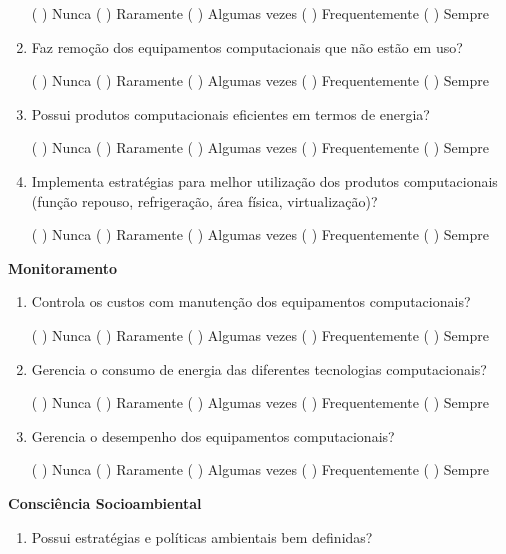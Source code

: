 \begin{apendicesenv}
\begin{enumerate}
    ( \space\space ) Nunca  ( \space\space ) Raramente  ( \space\space ) Algumas vezes  ( \space\space ) Frequentemente ( \space\space ) Sempre
    \item Faz remoção dos equipamentos computacionais que não estão em uso? 
    
    ( \space\space ) Nunca  ( \space\space ) Raramente  ( \space\space ) Algumas vezes  ( \space\space ) Frequentemente ( \space\space ) Sempre
    \item Possui produtos computacionais eficientes em termos de energia? 
    
    ( \space\space ) Nunca  ( \space\space ) Raramente  ( \space\space ) Algumas vezes  ( \space\space ) Frequentemente ( \space\space ) Sempre
    \item Implementa estratégias para melhor utilização dos produtos computacionais (função repouso, refrigeração, área física, virtualização)? 
    
    ( \space\space ) Nunca  ( \space\space ) Raramente  ( \space\space ) Algumas vezes  ( \space\space ) Frequentemente ( \space\space ) Sempre
\end{enumerate}
    
\textbf{Monitoramento}

\begin{enumerate}
    \item Controla os custos com manutenção dos equipamentos computacionais? 
    
    ( \space\space ) Nunca  ( \space\space ) Raramente  ( \space\space ) Algumas vezes  ( \space\space ) Frequentemente ( \space\space ) Sempre
    \item Gerencia o consumo de energia das diferentes tecnologias computacionais? 
    
    ( \space\space ) Nunca  ( \space\space ) Raramente  ( \space\space ) Algumas vezes  ( \space\space ) Frequentemente ( \space\space ) Sempre
    \item Gerencia o desempenho dos equipamentos computacionais? 
    
    ( \space\space ) Nunca  ( \space\space ) Raramente  ( \space\space ) Algumas vezes  ( \space\space ) Frequentemente ( \space\space ) Sempre
\end{enumerate}
    
\textbf{Consciência Socioambiental}

\begin{enumerate}
    \item Possui estratégias e políticas ambientais bem definidas? 
    

\end{enumerate}
\end{apendicesenv}
